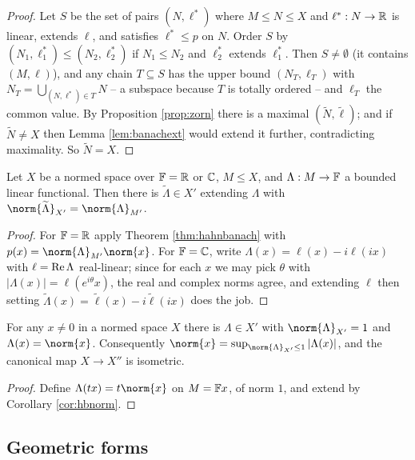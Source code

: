 \documentclass[a4paper]{scrartcl}
\newcommand{\wt}{\widetilde}
\begin{document}
\begin{proof}
	Let $S$ be the set of pairs $(N, \ell^*)$ where $M \le N \le X$ and $\ell^* : N \to \mathbb{R}$ is linear, extends $\ell$, and satisfies $\ell^* \le p$ on $N$. Order $S$ by $(N_1,\ell_1^*) \le (N_2,\ell_2^*)$ if $N_1 \le N_2$ and $\ell_2^*$ extends $\ell_1^*$. Then $S \ne \emptyset$ (it contains $(M,\ell)$), and any chain $T \subseteq S$ has the upper bound $(N_T, \ell_T)$ with $N_T = \bigcup_{(N,\ell^*) \in T} N$ -- a subspace because $T$ is totally ordered -- and $\ell_T$ the common value. By Proposition \ref{prop:zorn} there is a maximal $(\wt N, \wt\ell)$; and if $\wt N \ne X$ then Lemma \ref{lem:banachext} would extend it further, contradicting maximality. So $\wt N = X$.
\end{proof}

\begin{corollary}\label{cor:hbnorm}
	Let $X$ be a normed space over $\mathbb{F} = \mathbb{R}$ or $\mathbb{C}$, $M \le X$, and $\Lambda : M \to \mathbb{F}$ a bounded linear functional. Then there is $\wt \Lambda \in X'$ extending $\Lambda$ with $\norm{\wt\Lambda}_{X'} = \norm{\Lambda}_{M'}$.
\end{corollary}

\begin{proof}
	For $\mathbb{F} = \mathbb{R}$ apply Theorem \ref{thm:hahnbanach} with $p(x) = \norm{\Lambda}_{M'}\norm{x}$. For $\mathbb{F} = \mathbb{C}$, write $\Lambda(x) = \ell(x) - i\ell(ix)$ with $\ell = \operatorname{Re} \Lambda$ real-linear; since for each $x$ we may pick $\theta$ with $|\Lambda(x)| = \ell(e^{i\theta}x)$, the real and complex norms agree, and extending $\ell$ then setting $\wt\Lambda(x) = \wt\ell(x) - i\wt\ell(ix)$ does the job.
\end{proof}

\begin{corollary}\label{cor:hbnormattained}
	For any $x \ne 0$ in a normed space $X$ there is $\Lambda \in X'$ with $\norm{\Lambda}_{X'} = 1$ and $\Lambda(x) = \norm{x}$. Consequently $\norm{x} = \sup_{\norm{\Lambda}_{X'}\le 1}|\Lambda(x)|$, and the canonical map $X \to X''$ is isometric.
\end{corollary}

\begin{proof}
	Define $\Lambda(tx) = t\norm{x}$ on $M = \mathbb{F} x$, of norm $1$, and extend by Corollary \ref{cor:hbnorm}.
\end{proof}

\subsection{Geometric forms}
\end{document}

